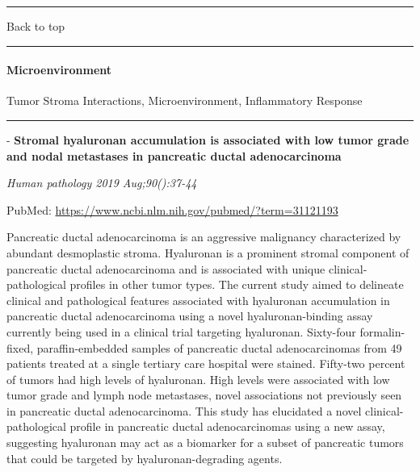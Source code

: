 \documentclass[]{article}
\let\oldparagraph\paragraph
\renewcommand{\paragraph}[1]{\oldparagraph{#1}\mbox{}}
\begin{document}
{}

{}

\begin{center}\rule{0.5\linewidth}{\linethickness}\end{center}

Back to top

\begin{center}\rule{0.5\linewidth}{\linethickness}\end{center}

\pagebreak

\hypertarget{microenvironment}{%
\paragraph{Microenvironment}\label{microenvironment}}

Tumor Stroma Interactions, Microenvironment, Inflammatory Response

\begin{center}\rule{0.5\linewidth}{\linethickness}\end{center}

 - \textbf{Stromal hyaluronan accumulation is associated with low tumor
grade and nodal metastases in pancreatic ductal adenocarcinoma}

\emph{Human pathology 2019 Aug;90():37-44}

PubMed: \url{https://www.ncbi.nlm.nih.gov/pubmed/?term=31121193}

Pancreatic ductal adenocarcinoma is an aggressive malignancy
characterized by abundant desmoplastic stroma. Hyaluronan is a prominent
stromal component of pancreatic ductal adenocarcinoma and is associated
with unique clinical-pathological profiles in other tumor types. The
current study aimed to delineate clinical and pathological features
associated with hyaluronan accumulation in pancreatic ductal
adenocarcinoma using a novel hyaluronan-binding assay currently being
used in a clinical trial targeting hyaluronan. Sixty-four
formalin-fixed, paraffin-embedded samples of pancreatic ductal
adenocarcinomas from 49 patients treated at a single tertiary care
hospital were stained. Fifty-two percent of tumors had high levels of
hyaluronan. High levels were associated with low tumor grade and lymph
node metastases, novel associations not previously seen in pancreatic
ductal adenocarcinoma. This study has elucidated a novel
clinical-pathological profile in pancreatic ductal adenocarcinomas using
a new assay, suggesting hyaluronan may act as a biomarker for a subset
of pancreatic tumors that could be targeted by hyaluronan-degrading
agents.
\end{document}
